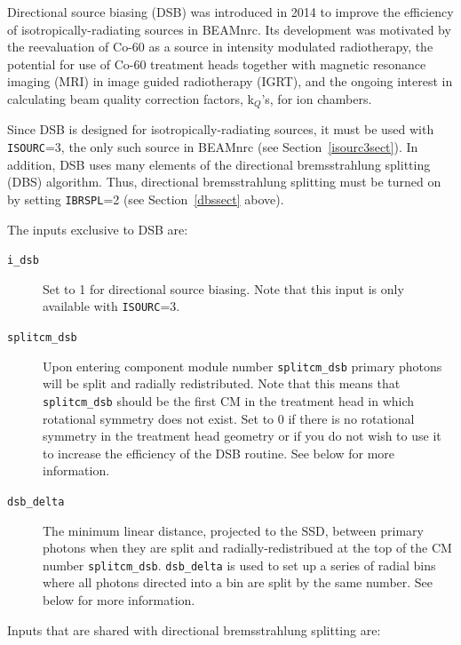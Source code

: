 \documentclass[12pt,twoside]{article}
\begin{document}
Directional source biasing (DSB) was introduced in 2014 to improve the efficiency
of isotropically-radiating sources in BEAMnrc.  Its development was motivated by
the reevaluation of Co-60 as a source in intensity modulated radiotherapy\cite{},
the potential for use of Co-60 treatment heads together with magnetic resonance
imaging (MRI) in image guided radiotherapy (IGRT)\cite{}, and the ongoing interest
in calculating beam quality correction factors, k$_Q$'s, for ion chambers.

Since DSB is designed for isotropically-radiating sources, it must be used
with {\tt ISOURC}=3, the only such source in BEAMnrc (see Section~\ref{isourc3sect}).
In addition, DSB uses many elements of the directional bremsstrahlung splitting (DBS)
algorithm.  Thus, directional bremsstrahlung splitting must be turned on by
setting {\tt IBRSPL}=2  (see Section~\ref{dbssect}
above).

The inputs exclusive to DSB are:

\begin{description}
\item [{\tt i\_dsb}] Set to 1 for directional source biasing.  Note that this input is
only available with {\tt ISOURC}=3.
\item [{\tt splitcm\_dsb}] Upon entering component module number {\tt splitcm\_dsb} primary photons
will be split and radially redistributed.  Note that this means that {\tt splitcm\_dsb} should be the first CM in
the treatment head in which rotational symmetry does not exist.  Set to 0 if there is no rotational symmetry
in the treatment head geometry or if you do not wish to use it to increase the efficiency of the DSB routine.
See below for more information.
\item[{\tt dsb\_delta}] The minimum linear distance, projected to the SSD, between primary photons
when they are split and radially-redistribued at the top of the CM number {\tt splitcm\_dsb}.  {\tt dsb\_delta}
is used to set up a series of radial bins where all photons directed into a bin are split by the same number.
See below for more information.
\end{description}

Inputs that are shared with directional bremsstrahlung splitting are:
\end{document}
